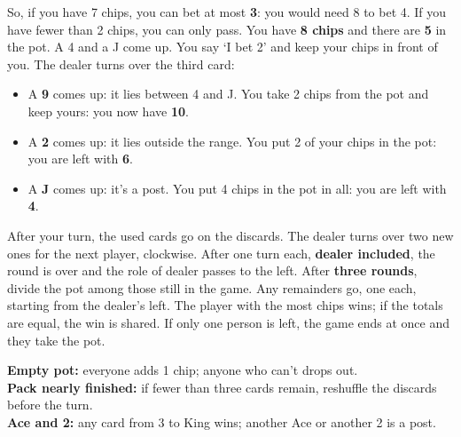 \documentclass[10pt]{article}
\begin{document}
So, if you have 7 chips, you can bet at most \textbf{3}: you would need 8 to bet 4. If you have fewer than 2 chips, you can only pass.
You have \textbf{8 chips} and there are \textbf{5} in the pot. A 4 and a J come up. You say ‘I bet 2’ and keep your chips in front of you. The dealer turns over the third card:
\begin{itemize}
 \item A \textbf{9} comes up: it lies between 4 and J. You take 2 chips from the pot and keep yours: you now have \textbf{10}.
 \item A \textbf{2} comes up: it lies outside the range. You put 2 of your chips in the pot: you are left with \textbf{6}.
 \item A \textbf{J} comes up: it’s a post. You put 4 chips in the pot in all: you are left with \textbf{4}.
\end{itemize}
After your turn, the used cards go on the discards. The dealer turns over two new ones for the next player, clockwise. After one turn each, \textbf{dealer included}, the round is over and the role of dealer passes to the left.
After \textbf{three rounds}, divide the pot among those still in the game. Any remainders go, one each, starting from the dealer’s left. The player with the most chips wins; if the totals are equal, the win is shared. If only one person is left, the game ends at once and they take the pot.
\begin{callout}
\textbf{Empty pot:} everyone adds 1 chip; anyone who can’t drops out.\\
\textbf{Pack nearly finished:} if fewer than three cards remain, reshuffle the discards before the turn.\\
\textbf{Ace and 2:} any card from 3 to King wins; another Ace or another 2 is a post.
\end{callout}
\end{document}
